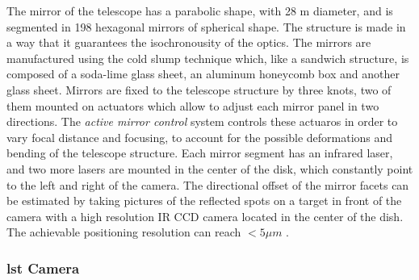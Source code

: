 \documentclass[main.tex]{subfiles}
\begin{document}
  The mirror of the telescope has a parabolic shape, with 28 m diameter,  and is segmented in 198 hexagonal mirrors of spherical shape. The structure is made in a way that it guarantees the isochronousity of the optics. The mirrors are manufactured using the cold slump technique which, like a sandwich structure, is composed of a soda-lime glass sheet, an aluminum honeycomb box and another glass sheet\cite{2017LST}.
Mirrors are fixed to the telescope structure by three knots, two of them mounted on actuators which allow to adjust each mirror panel in two directions. The \textit{active mirror control} system controls these actuaros in order to vary focal distance and focusing, to account for the possible deformations and bending of the telescope structure. Each mirror segment has an infrared laser, and two more lasers are mounted in the center of the disk, which constantly point to the left and right of the camera. The directional offset of the mirror facets can be estimated by taking pictures of the reflected spots on a target in front of the camera with a high resolution IR CCD camera located in the center of the dish. The achievable positioning resolution can reach $< 5 \mu m$ \cite{2013LST}.
  
  \subsubsection{\gls{lst} Camera}
\end{document}
